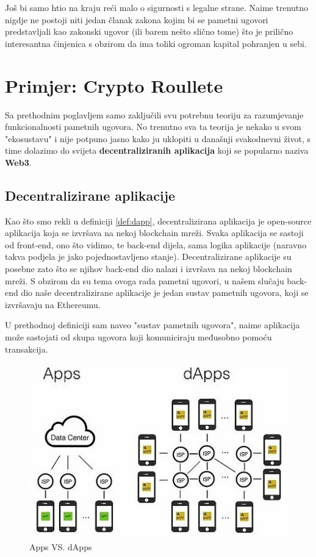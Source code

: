 \documentclass[a4paper,oneside,12pt]{memoir} %
\begin{document}
Još bi samo htio na kraju reći malo o sigurnosti s legalne strane. Naime trenutno nigdje ne postoji niti jedan članak zakona kojim bi se pametni ugovori predstavljali kao zakonski ugovor (ili barem nešto slično tome) što je prilično interesantna činjenica s obzirom da ima toliki ogroman kapital pohranjen u sebi.
    
\chapter{Primjer: Crypto Roullete}

Sa prethodnim poglavljem samo zaključili svu potrebnu teoriju za razumjevanje funkcionalnosti pametnih ugovora. No trenutno sva ta teorija je nekako u svom "ekosustavu" i nije potpuno jasno kako ju uklopiti u današnji svakodnevni život, s time dolazimo do svijeta \textbf{decentraliziranih aplikacija} koji se popularno naziva \textbf{Web3}.

\section{Decentralizirane aplikacije}

Kao što smo rekli u definiciji \ref{def:dapp}, decentralizirana aplikacija je open-source aplikacija koja se izvršava na nekoj blockchain mreži. Svaka aplikacija se sastoji od front-end, ono što vidimo, te back-end dijela, sama logika aplikacije (naravno takva podjela je jako pojednostavljeno stanje). Decentralizirane aplikacije su posebne zato što se njihov back-end dio nalazi i izvršava na nekoj blockchain mreži. S obzirom da su tema ovoga rada pametni ugovori, u našem slučaju back-end dio naše decentralizirane aplikacije je jedan sustav pametnih ugovora, koji se izvršavaju na Ethereumu. 

\begin{napomena}
U prethodnoj definiciji sam naveo "sustav pametnih ugovora", naime aplikacija može sastojati od skupa ugovora koji komuniciraju međusobno pomoću transakcija.
\end{napomena}

\begin{figure}[h]
\centering
\includegraphics[scale=0.7]{AppsVSdApps}
\caption{Apps VS. dApps}
\label{fig:appvsdapp}
\end{figure}
\end{document}

